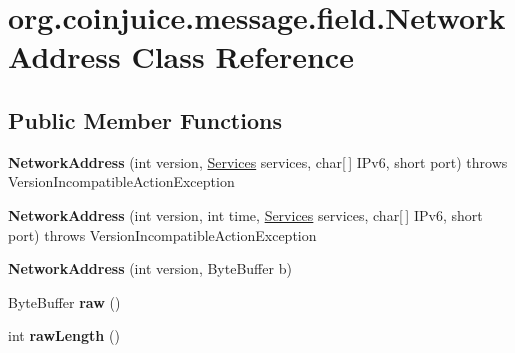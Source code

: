 \hypertarget{classorg_1_1coinjuice_1_1message_1_1field_1_1_network_address}{\section{org.\-coinjuice.\-message.\-field.\-Network\-Address Class Reference}
\label{classorg_1_1coinjuice_1_1message_1_1field_1_1_network_address}
}
\subsection*{Public Member Functions}
\begin{DoxyCompactItemize}
\item 
\hypertarget{classorg_1_1coinjuice_1_1message_1_1field_1_1_network_address_ae16a7cd60a3090468ab16ba1d35c4090}{{\bfseries Network\-Address} (int version, \hyperlink{classorg_1_1coinjuice_1_1message_1_1field_1_1_services}{Services} services, char\mbox{[}$\,$\mbox{]} I\-Pv6, short port)  throws Version\-Incompatible\-Action\-Exception }\label{classorg_1_1coinjuice_1_1message_1_1field_1_1_network_address_ae16a7cd60a3090468ab16ba1d35c4090}

\item 
\hypertarget{classorg_1_1coinjuice_1_1message_1_1field_1_1_network_address_a51cbd622fa0ea9d357fad01c6efa5f90}{{\bfseries Network\-Address} (int version, int time, \hyperlink{classorg_1_1coinjuice_1_1message_1_1field_1_1_services}{Services} services, char\mbox{[}$\,$\mbox{]} I\-Pv6, short port)  throws Version\-Incompatible\-Action\-Exception }\label{classorg_1_1coinjuice_1_1message_1_1field_1_1_network_address_a51cbd622fa0ea9d357fad01c6efa5f90}

\item 
\hypertarget{classorg_1_1coinjuice_1_1message_1_1field_1_1_network_address_a670ee4e4639691f8c82e8d6166500420}{{\bfseries Network\-Address} (int version, Byte\-Buffer b)}\label{classorg_1_1coinjuice_1_1message_1_1field_1_1_network_address_a670ee4e4639691f8c82e8d6166500420}

\item 
\hypertarget{classorg_1_1coinjuice_1_1message_1_1field_1_1_network_address_ab357d6908dd92f578b5f3701dc50f3ab}{Byte\-Buffer {\bfseries raw} ()}\label{classorg_1_1coinjuice_1_1message_1_1field_1_1_network_address_ab357d6908dd92f578b5f3701dc50f3ab}

\item 
\hypertarget{classorg_1_1coinjuice_1_1message_1_1field_1_1_network_address_acd9402ed1a466fa3e2a3ba9f432166d5}{int {\bfseries raw\-Length} ()}\label{classorg_1_1coinjuice_1_1message_1_1field_1_1_network_address_acd9402ed1a466fa3e2a3ba9f432166d5}

\end{DoxyCompactItemize}
